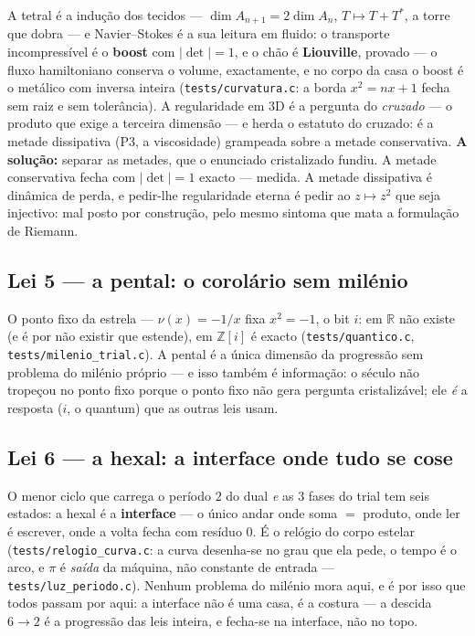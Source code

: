 \documentclass[11pt,a4paper]{article}
\newcommand{\code}[1]{\texttt{\small #1}}
\begin{document}
A tetral é a indução dos tecidos --- $\dim A_{n+1}=2\dim A_n$, $T\mapsto T+T^{*}$, a torre que dobra
--- e Navier--Stokes é a sua leitura em fluido: o transporte incompressível é o \textbf{boost} com
$|\det|=1$, e o chão é \textbf{Liouville}, provado --- o fluxo hamiltoniano conserva o volume,
exactamente, e no corpo da casa o boost é o metálico com inversa inteira
(\code{tests/curvatura.c}: a borda $x^{2}=nx+1$ fecha sem raiz e sem tolerância). A regularidade em
$3$D é a pergunta do \emph{cruzado} --- o produto que exige a terceira dimensão --- e herda o
estatuto do cruzado: é a metade dissipativa (P3, a viscosidade) grampeada sobre a metade
conservativa. \textbf{A solução:} separar as metades, que o enunciado cristalizado fundiu. A metade
conservativa fecha com $|\det|=1$ exacto --- medida. A metade dissipativa é dinâmica de perda, e
pedir-lhe regularidade eterna é pedir ao $z\mapsto z^{2}$ que seja injectivo: mal posto por
construção, pelo mesmo sintoma que mata a formulação de Riemann.

\subsection{Lei 5 --- a pental: o corolário sem milénio}\label{sub:pental}

O ponto fixo da estrela --- $\nu(x)=-1/x$ fixa $x^{2}=-1$, o bit $i$: em $\mathbb R$ não existe (e é
por não existir que estende), em $\mathbb Z[i]$ é exacto (\code{tests/quantico.c},
\code{tests/milenio\_trial.c}). A pental é a única dimensão da progressão sem problema do milénio
próprio --- e isso também é informação: o século não tropeçou no ponto fixo porque o ponto fixo não
gera pergunta cristalizável; ele \emph{é} a resposta ($i$, o quantum) que as outras leis usam.

\subsection{Lei 6 --- a hexal: a interface onde tudo se cose}\label{sub:hexal}

O menor ciclo que carrega o período $2$ do dual \emph{e} as $3$ fases do trial tem seis estados: a
hexal é a \textbf{interface} --- o único andar onde soma $=$ produto, onde ler é escrever, onde a
volta fecha com resíduo $0$. É o relógio do corpo estelar (\code{tests/relogio\_curva.c}: a curva
desenha-se no grau que ela pede, o tempo é o arco, e $\pi$ é \emph{saída} da máquina, não constante
de entrada --- \code{tests/luz\_periodo.c}). Nenhum problema do milénio mora aqui, e é por isso que
todos passam por aqui: a interface não é uma casa, é a costura --- a descida $6\to2$ é a progressão
das leis inteira, e fecha-se na interface, não no topo.
\end{document}
